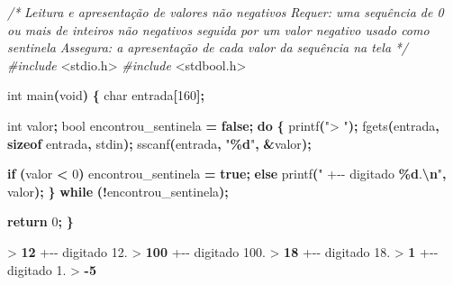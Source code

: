 \documentclass[
  11pt,
  a4paper,
]{scrbook}
\newenvironment{Shaded}{\begin{snugshade}}{\end{snugshade}}
\newcommand{\CommentTok}[1]{\textcolor[rgb]{0.56,0.35,0.01}{\textit{#1}}}
\newcommand{\ControlFlowTok}[1]{\textcolor[rgb]{0.13,0.29,0.53}{\textbf{#1}}}
\newcommand{\DataTypeTok}[1]{\textcolor[rgb]{0.13,0.29,0.53}{#1}}
\newcommand{\DecValTok}[1]{\textcolor[rgb]{0.00,0.00,0.81}{#1}}
\newcommand{\ImportTok}[1]{#1}
\newcommand{\KeywordTok}[1]{\textcolor[rgb]{0.13,0.29,0.53}{\textbf{#1}}}
\newcommand{\NormalTok}[1]{#1}
\newcommand{\OperatorTok}[1]{\textcolor[rgb]{0.81,0.36,0.00}{\textbf{#1}}}
\newcommand{\PreprocessorTok}[1]{\textcolor[rgb]{0.56,0.35,0.01}{\textit{#1}}}
\newcommand{\SpecialCharTok}[1]{\textcolor[rgb]{0.81,0.36,0.00}{\textbf{#1}}}
\newcommand{\StringTok}[1]{\textcolor[rgb]{0.31,0.60,0.02}{#1}}
\begin{document}
\begin{Shaded}
\begin{Highlighting}[]
\CommentTok{/*}
\CommentTok{Leitura e apresentação de valores não negativos}
\CommentTok{Requer: uma sequência de 0 ou mais de inteiros não negativos seguida}
\CommentTok{    por um valor negativo usado como sentinela}
\CommentTok{Assegura: a apresentação de cada valor da sequência na tela}
\CommentTok{*/}
\PreprocessorTok{\#include }\ImportTok{\textless{}stdio.h\textgreater{}}
\PreprocessorTok{\#include }\ImportTok{\textless{}stdbool.h\textgreater{}}

\DataTypeTok{int}\NormalTok{ main}\OperatorTok{(}\DataTypeTok{void}\OperatorTok{)} \OperatorTok{\{}
    \DataTypeTok{char}\NormalTok{ entrada}\OperatorTok{[}\DecValTok{160}\OperatorTok{];}

    \DataTypeTok{int}\NormalTok{ valor}\OperatorTok{;}
    \DataTypeTok{bool}\NormalTok{ encontrou\_sentinela }\OperatorTok{=} \KeywordTok{false}\OperatorTok{;}
    \ControlFlowTok{do} \OperatorTok{\{}
\NormalTok{        printf}\OperatorTok{(}\StringTok{"\textgreater{} "}\OperatorTok{);}
\NormalTok{        fgets}\OperatorTok{(}\NormalTok{entrada}\OperatorTok{,} \KeywordTok{sizeof}\NormalTok{ entrada}\OperatorTok{,}\NormalTok{ stdin}\OperatorTok{);}
\NormalTok{        sscanf}\OperatorTok{(}\NormalTok{entrada}\OperatorTok{,} \StringTok{"}\SpecialCharTok{\%d}\StringTok{"}\OperatorTok{,} \OperatorTok{\&}\NormalTok{valor}\OperatorTok{);}

        \ControlFlowTok{if} \OperatorTok{(}\NormalTok{valor }\OperatorTok{\textless{}} \DecValTok{0}\OperatorTok{)}
\NormalTok{            encontrou\_sentinela }\OperatorTok{=} \KeywordTok{true}\OperatorTok{;}
        \ControlFlowTok{else}
\NormalTok{            printf}\OperatorTok{(}\StringTok{"  +{-}{-} digitado }\SpecialCharTok{\%d}\StringTok{.}\SpecialCharTok{\textbackslash{}n}\StringTok{"}\OperatorTok{,}\NormalTok{ valor}\OperatorTok{);}
    \OperatorTok{\}} \ControlFlowTok{while} \OperatorTok{(!}\NormalTok{encontrou\_sentinela}\OperatorTok{);}

    \ControlFlowTok{return} \DecValTok{0}\OperatorTok{;}
\OperatorTok{\}}
\end{Highlighting}
\end{Shaded}

\begin{Shaded}
\begin{Highlighting}[]
\NormalTok{\textgreater{} }\KeywordTok{ 12 }
\NormalTok{  +{-}{-} digitado 12.}
\NormalTok{\textgreater{} }\KeywordTok{ 100 }
\NormalTok{  +{-}{-} digitado 100.}
\NormalTok{\textgreater{} }\KeywordTok{ 18 }
\NormalTok{  +{-}{-} digitado 18.}
\NormalTok{\textgreater{} }\KeywordTok{ 1 }
\NormalTok{  +{-}{-} digitado 1.}
\NormalTok{\textgreater{} }\KeywordTok{ {-}5 }
\end{Highlighting}
\end{Shaded}
\end{document}

